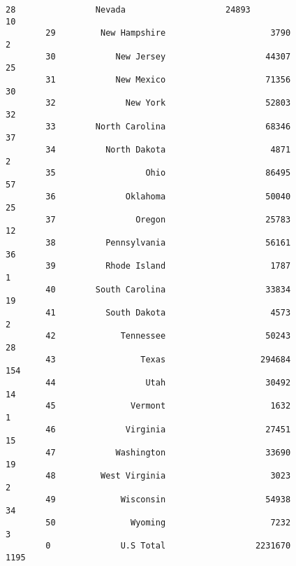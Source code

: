 \documentclass[11pt]{article}
\begin{document}
\begin{Verbatim}[commandchars=\\\{\}]
        28                Nevada                    24893                      10   
        29         New Hampshire                     3790                       2   
        30            New Jersey                    44307                      25   
        31            New Mexico                    71356                      30   
        32              New York                    52803                      32   
        33        North Carolina                    68346                      37   
        34          North Dakota                     4871                       2   
        35                  Ohio                    86495                      57   
        36              Oklahoma                    50040                      25   
        37                Oregon                    25783                      12   
        38          Pennsylvania                    56161                      36   
        39          Rhode Island                     1787                       1   
        40        South Carolina                    33834                      19   
        41          South Dakota                     4573                       2   
        42             Tennessee                    50243                      28   
        43                 Texas                   294684                     154   
        44                  Utah                    30492                      14   
        45               Vermont                     1632                       1   
        46              Virginia                    27451                      15   
        47            Washington                    33690                      19   
        48         West Virginia                     3023                       2   
        49             Wisconsin                    54938                      34   
        50               Wyoming                     7232                       3   
        0              U.S Total                  2231670                    1195   
        

\end{Verbatim}
\end{document}
